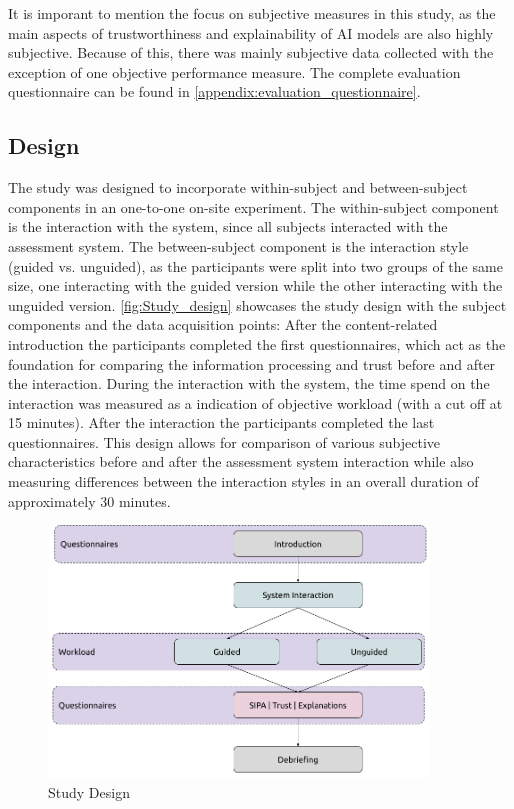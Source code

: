 \documentclass[11pt,a4paper,english]{scrreprt}
\begin{document}
It is imporant to mention the focus on subjective measures in this study, as the main aspects of trustworthiness and explainability of AI models are also highly subjective. Because of this, there was mainly subjective data collected with the exception of one objective performance measure. The complete evaluation questionnaire can be found in \autoref{appendix:evaluation_questionnaire}.

\subsection{Design}
The study was designed to incorporate within-subject and between-subject components in an one-to-one on-site experiment. The within-subject component is the interaction with the system, since all subjects interacted with the assessment system. The between-subject component is the interaction style (guided vs. unguided), as the participants were split into two groups of the same size, one interacting with the guided version while the other interacting with the unguided version. \autoref{fig:Study_design} showcases the study design with the subject components and the data acquisition points: After the content-related introduction the participants completed the first questionnaires, which act as the foundation for comparing the information processing and trust before and after the interaction. During the interaction with the system, the time spend on the interaction was measured as a indication of objective workload (with a cut off at 15 minutes). After the interaction the participants completed the last questionnaires. This design allows for comparison of various subjective characteristics before and after the assessment system interaction while also measuring differences between the interaction styles in an overall duration of approximately 30 minutes.

\begin{figure}[htbp]
    \centering
    \includegraphics[width=0.9\textwidth]{img/study_design.png}
    \caption{Study Design}
    \label{fig:Study_design}
\end{figure}
\end{document}
